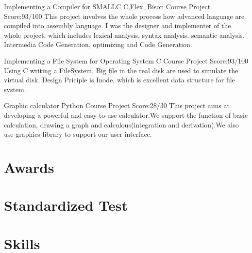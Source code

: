 \documentclass[11pt,a4paper]{moderncv}
\begin{document}
\vspace*{0.2\baselineskip}
{Implementing a Compiler for SMALLC}
{C,Flex, Bison}
{Course Project}
{Score:93/100}
{
This project involves the whole process how advanced language are compiled into assembly language.
I was the designer and implementer of the whole project, which includes lexical analysis, syntax analysis,
semantic analysis, Intermedia Code Generation, optimizing and Code Generation.\\
}

{Implementing a File System for Operating System}
{C}
{Course Project}
{Score:93/100}
{
Using C writing a FileSystem. Big file in the real disk are used to simulate the virtual disk. Design Priciple is Inode, which is excellent data structure for file system.\\
}


\vspace*{0.2\baselineskip}
{Graphic calculator}
{Python}
{Course Project}
{Score:28/30}
{
This project aims at developing a powerful and easy-to-use calculator.We support the function of basic
calculation, drawing a graph and calculous(integration and derivation).We also use graphics library to support our user interface.\\
}

\section{Awards}

\section{Standardized Test}


\section{Skills}
\end{document}

